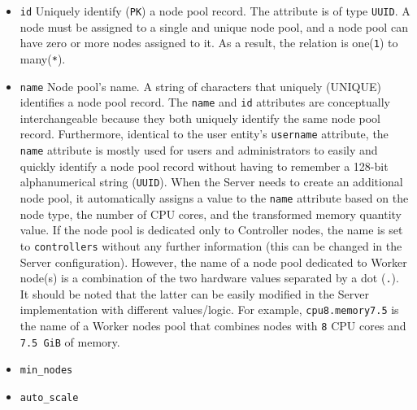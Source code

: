 \begin{itemize}
  \item \texttt{id}
    \newline
    Uniquely identify (\texttt{PK}) a node pool record.
    \newline
    The attribute is of type \texttt{UUID}.
    \newline
    A node must be assigned to a single and unique node pool, and a node pool can
    have zero or more nodes assigned to it. As a result, the relation is one(\texttt{1})
    to many(\texttt{*}).

  \item \texttt{name}
    \newline
    Node pool's name.
    \newline
    A string of characters that uniquely (UNIQUE) identifies a node pool record.
    \newline
    The \texttt{name} and \texttt{id} attributes are conceptually
    interchangeable because they both uniquely identify the same node pool
    record. Furthermore, identical to the user entity's \texttt{username} attribute,
    the \texttt{name} attribute is mostly used for users and administrators to easily
    and quickly identify a node pool record without having to remember a 128-bit
    alphanumerical string (\texttt{UUID}).
    \newline
    When the Server needs to create an additional node pool, it automatically
    assigns a value to the \texttt{name} attribute based on the node type, the
    number of CPU cores, and the transformed memory quantity value. If the node
    pool is dedicated only to Controller nodes, the name is set to \texttt{controllers}
    without any further information (this can be changed in the Server configuration).
    However, the name of a node pool dedicated to Worker node(s) is a combination
    of the two hardware values separated by a dot (\texttt{.}). It should be noted
    that the latter can be easily modified in the Server implementation with different
    values/logic.
    \newline
    For example, \texttt{cpu8.memory7.5} is the name of a Worker nodes pool that
    combines nodes with \texttt{8} CPU cores and \texttt{7.5 GiB} of memory.

  \item \texttt{min\_nodes}
    \newline

  \item \texttt{auto\_scale}
    \newline


\end{itemize}
